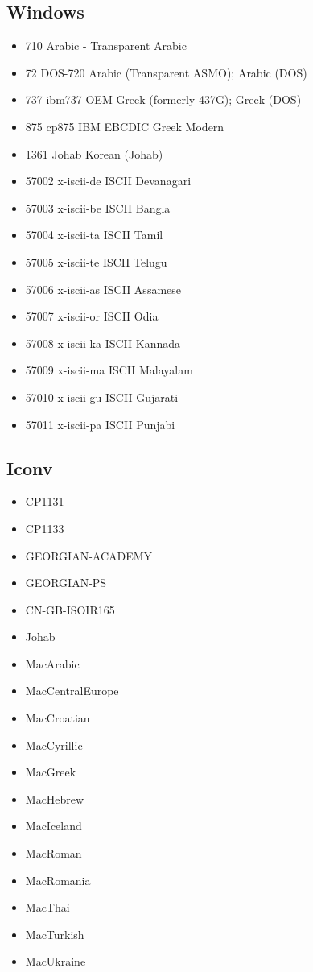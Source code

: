 \documentclass{wg21}
\begin{document}
\subsection{Windows}
\begin{itemize}
\item 710 Arabic - Transparent Arabic
\item 72  DOS-720	Arabic (Transparent ASMO); Arabic (DOS)
\item 737 ibm737	OEM Greek (formerly 437G); Greek (DOS)
\item 875 cp875	IBM EBCDIC Greek Modern
\item 1361	Johab	Korean (Johab)
\item 57002	x-iscii-de	ISCII Devanagari
\item 57003	x-iscii-be	ISCII Bangla
\item 57004	x-iscii-ta	ISCII Tamil
\item 57005	x-iscii-te	ISCII Telugu
\item 57006	x-iscii-as	ISCII Assamese
\item 57007	x-iscii-or	ISCII Odia
\item 57008	x-iscii-ka	ISCII Kannada
\item 57009	x-iscii-ma	ISCII Malayalam
\item 57010	x-iscii-gu	ISCII Gujarati
\item 57011	x-iscii-pa	ISCII Punjabi
\end{itemize}

\subsection{Iconv}
\begin{itemize}
\item CP1131
\item CP1133
\item GEORGIAN-ACADEMY
\item GEORGIAN-PS
\item CN-GB-ISOIR165
\item Johab
\item MacArabic
\item MacCentralEurope
\item MacCroatian
\item MacCyrillic
\item MacGreek
\item MacHebrew
\item MacIceland
\item MacRoman
\item MacRomania
\item MacThai
\item MacTurkish
\item MacUkraine


\end{itemize}
\end{document}
